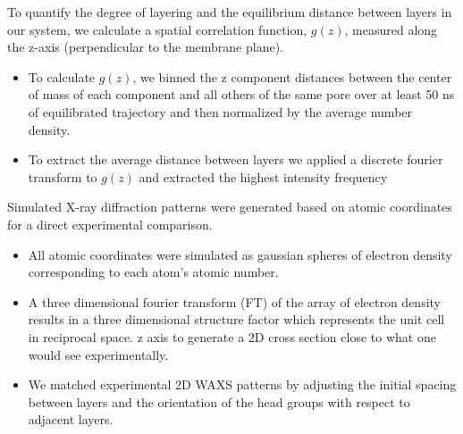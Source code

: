 \documentclass{article}
\begin{document}
  To quantify the degree of layering and the equilibrium distance between layers
  in our system, we calculate a spatial correlation function, $g(z)$, measured
  along the z-axis (perpendicular to the membrane plane).
  \begin{itemize}
    \item To calculate $g(z)$, we binned the z component distances between
    the center of mass of each component and all others of the same pore
    over at least 50 ns of equilibrated trajectory and then normalized by the 
    average number density.
    \item To extract the average distance between layers we applied a discrete
    fourier transform to $g(z)$ and extracted the highest intensity frequency
  \end{itemize}

  Simulated X-ray diffraction patterns were generated based on atomic
  coordinates for a direct experimental comparison.
  \begin{itemize}
    \item All atomic coordinates were simulated as gaussian spheres of electron
    density corresponding to each atom's atomic number.
    \item A three dimensional fourier transform (FT) of the array of electron 
    density results in a three dimensional structure factor which represents
    the unit cell in reciprocal space.
    z axis to generate a 2D cross section close to what one would see 
    experimentally.
    \item We matched experimental 2D WAXS patterns by adjusting the initial 
    spacing between layers and the orientation of the head groups with respect
    to adjacent layers.
  \end{itemize}
  
\end{document}
